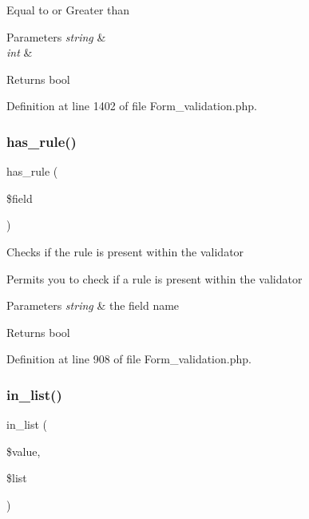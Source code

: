 Equal to or Greater than


\begin{DoxyParams}{Parameters}
{\em string} & \\
\hline
{\em int} & \\
\hline
\end{DoxyParams}
\begin{DoxyReturn}{Returns}
bool 
\end{DoxyReturn}


Definition at line 1402 of file Form\+\_\+validation.\+php.

\mbox{\label{class_c_i___form__validation_aaf0ef71d3e9ac390f52441f27e4b7786}} 
\subsubsection{\texorpdfstring{has\_rule()}{has\_rule()}}
{\footnotesize\ttfamily has\+\_\+rule (\begin{DoxyParamCaption}\item[{}]{\$field }\end{DoxyParamCaption})}

Checks if the rule is present within the validator

Permits you to check if a rule is present within the validator


\begin{DoxyParams}{Parameters}
{\em string} & the field name \\
\hline
\end{DoxyParams}
\begin{DoxyReturn}{Returns}
bool 
\end{DoxyReturn}


Definition at line 908 of file Form\+\_\+validation.\+php.

\mbox{\label{class_c_i___form__validation_a27365f05674ed5c959747000113f29aa}} 
\subsubsection{\texorpdfstring{in\_list()}{in\_list()}}
{\footnotesize\ttfamily in\+\_\+list (\begin{DoxyParamCaption}\item[{}]{\$value,  }\item[{}]{\$list }\end{DoxyParamCaption})}


